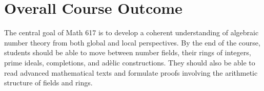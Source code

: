 \documentclass[11pt]{article}
\begin{document}
\section{Overall Course Outcome}

The central goal of Math 617 is to develop a coherent understanding of
algebraic number theory from both global and local perspectives. By the end
of the course, students should be able to move between number fields, their
rings of integers, prime ideals, completions, and adèlic constructions.
They should also be able to read advanced mathematical texts and formulate
proofs involving the arithmetic structure of fields and rings.
\end{document}

